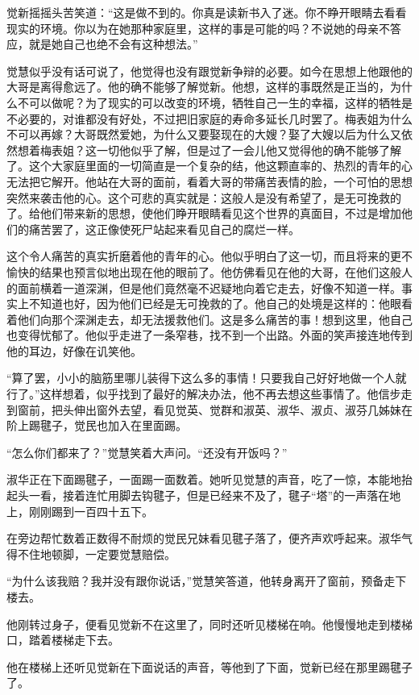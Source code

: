 \par 觉新摇摇头苦笑道：“这是做不到的。你真是读新书入了迷。你不睁开眼睛去看看现实的环境。你以为在她那种家庭里，这样的事是可能的吗？不说她的母亲不答应，就是她自己也绝不会有这种想法。”
\par 觉慧似乎没有话可说了，他觉得也没有跟觉新争辩的必要。如今在思想上他跟他的大哥是离得愈远了。他的确不能够了解觉新。他想，这样的事既然是正当的，为什么不可以做呢？为了现实的可以改变的环境，牺牲自己一生的幸福，这样的牺牲是不必要的，对谁都没有好处，不过把旧家庭的寿命多延长几时罢了。梅表姐为什么不可以再嫁？大哥既然爱她，为什么又要娶现在的大嫂？娶了大嫂以后为什么又依然想着梅表姐？这一切他似乎了解，但是过了一会儿他又觉得他的确不能够了解了。这个大家庭里面的一切简直是一个复杂的结，他这颗直率的、热烈的青年的心无法把它解开。他站在大哥的面前，看着大哥的带痛苦表情的脸，一个可怕的思想突然来袭击他的心。这个可悲的真实就是：这般人是没有希望了，是无可挽救的了。给他们带来新的思想，使他们睁开眼睛看见这个世界的真面目，不过是增加他们的痛苦罢了，这正像使死尸站起来看见自己的腐烂一样。
\par 这个令人痛苦的真实折磨着他的青年的心。他似乎明白了这一切，而且将来的更不愉快的结果也预言似地出现在他的眼前了。他仿佛看见在他的大哥，在他们这般人的面前横着一道深渊，但是他们竟然毫不迟疑地向着它走去，好像不知道一样。事实上不知道也好，因为他们已经是无可挽救的了。他自己的处境是这样的：他眼看着他们向那个深渊走去，却无法援救他们。这是多么痛苦的事！想到这里，他自己也变得忧郁了。他似乎走进了一条窄巷，找不到一个出路。外面的笑声接连地传到他的耳边，好像在讥笑他。
\par “算了罢，小小的脑筋里哪儿装得下这么多的事情！只要我自己好好地做一个人就行了。”这样想着，似乎找到了最好的解决办法，他不再去想这些事情了。他信步走到窗前，把头伸出窗外去望，看见觉英、觉群和淑英、淑华、淑贞、淑芬几姊妹在阶上踢毽子，觉民也加入在里面踢。
\par “怎么你们都来了？”觉慧笑着大声问。“还没有开饭吗？”
\par 淑华正在下面踢毽子，一面踢一面数着。她听见觉慧的声音，吃了一惊，本能地抬起头一看，接着连忙用脚去钩毽子，但是已经来不及了，毽子“塔”的一声落在地上，刚刚踢到一百四十五下。
\par 在旁边帮忙数着正数得不耐烦的觉民兄妹看见毽子落了，便齐声欢呼起来。淑华气得不住地顿脚，一定要觉慧赔偿。
\par “为什么该我赔？我并没有跟你说话，”觉慧笑答道，他转身离开了窗前，预备走下楼去。
\par 他刚转过身子，便看见觉新不在这里了，同时还听见楼梯在响。他慢慢地走到楼梯口，踏着楼梯走下去。
\par 他在楼梯上还听见觉新在下面说话的声音，等他到了下面，觉新已经在那里踢毽子了。
